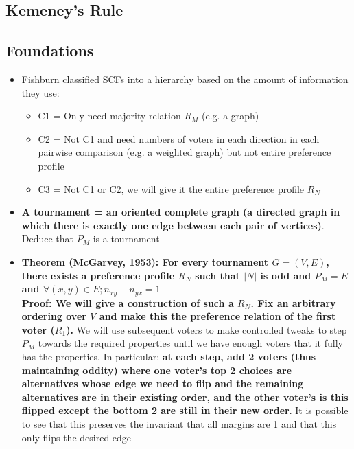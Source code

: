 \documentclass[20pt,a4paper,landscape]{extarticle}
\begin{document}
\begin{flushleft}
\section{Kemeney's Rule}
\subsection{Foundations}
\begin{itemize}
\item Fishburn classified SCFs into a hierarchy based on the amount of information they use:
    \begin{itemize}
    \item C1 = Only need majority relation $R_M$ (e.g. a graph)
    \item C2 = Not C1 and need numbers of voters in each direction in each pairwise comparison (e.g. a weighted graph) but not entire preference profile
    \item C3 = Not C1 or C2, we will give it the entire preference profile $R_N$
    \end{itemize}
\item \textbf{A tournament = an oriented complete graph (a directed graph in which there is exactly one edge between each pair of vertices)}. Deduce that $P_M$ is a tournament
\item \textbf{Theorem (McGarvey, 1953): For every tournament $G=(V,E)$, there exists a preference profile $R_N$ such that $|N|$ is odd and $P_M=E$ and $\forall (x,y)\in E; n_{xy}-n_{yx}=1$\\
Proof: We will give a construction of such a $R_N$. Fix an arbitrary ordering over $V$ and make this the preference relation of the first voter ($R_1$).} We will use subsequent voters to make controlled tweaks to step $P_M$ towards the required properties until we have enough voters that it fully has the properties. In particular: \textbf{at each step, add 2 voters (thus maintaining oddity) where one voter's top 2 choices are alternatives whose edge we need to flip and the remaining alternatives are in their existing order, and the other voter's is this flipped except the bottom 2 are still in their new order}. It is possible to see that this preserves the invariant that all margins are 1 and that this only flips the desired edge
\end{itemize}

\end{flushleft}
\end{document}
